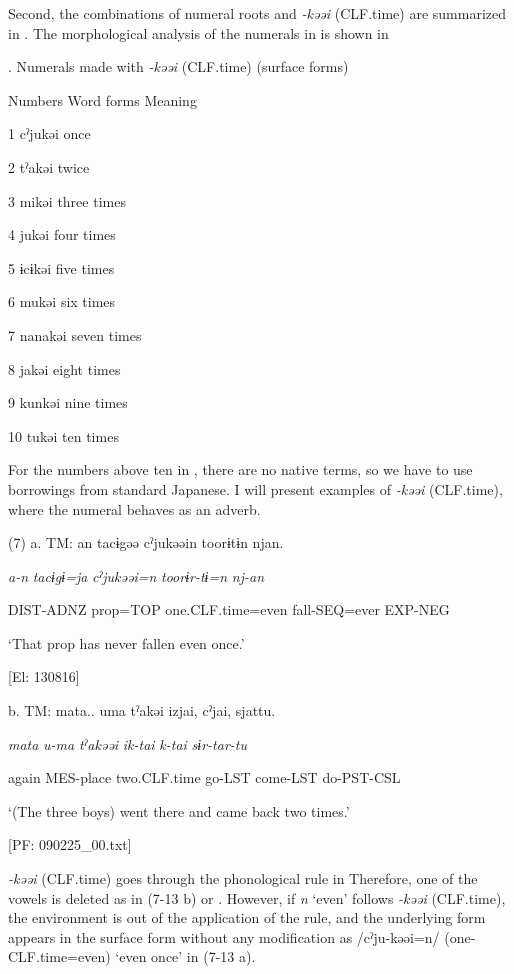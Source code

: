 Second, the combinations of numeral roots and \textit{{}-kəəi} (CLF.time) are summarized in . The morphological analysis of the numerals in  is shown in 

\begin{styleBeschriftung}
\textmd{}\textmd{. Numerals made with}\textmd{ \textit{-kəəi}}\textmd{ (CLF.time) (surface forms)}
\end{styleBeschriftung}

Numbers  Word forms  Meaning

1  cˀjukəi  once

2  tˀakəi  twice

3  mikəi  three times

4  jukəi  four times

5  ɨcɨkəi  five times

6  mukəi  six times

7  nanakəi  seven times

8  jakəi  eight times

9  kunkəi  nine times

10  tukəi  ten times

For the numbers above ten in , there are no native terms, so we have to use borrowings from standard Japanese. I will present examples of \textit{{}-kəəi} (CLF.time), where the numeral behaves as an adverb.

(7)  a.  TM:  an  tacɨgəə  cˀjukəəin  toorɨtɨn  njan.

      \textit{a-n}  \textit{tacɨgɨ=ja}  \textit{cˀjukəəi=n}  \textit{toorɨr-tɨ=n}  \textit{nj{}-an}

      DIST-ADNZ  prop=TOP  one.CLF.time=even  fall-SEQ=ever  EXP-NEG

      ‘That prop has never fallen even once.’

      [El: 130816]

  b.  TM:  mata..  uma  tˀakəi  izjai,  cˀjai,  sjattu.

      \textit{mata}  \textit{u-ma}  \textit{tˀakəəi}  \textit{ik-tai}  \textit{k-tai}  \textit{sɨr-tar-tu}

      again  MES-place  two.CLF.time  go-LST  come-LST  do-PST-CSL

      ‘(The three boys) went there and came back two times.’

      [PF: 090225\_00.txt]

\textit{{}-kəəi} (CLF.time) goes through the phonological rule in  Therefore, one of the vowels is deleted as in (7-13 b) or . However, if \textit{n} ‘even’ follows \textit{{}-kəəi} (CLF.time), the environment is out of the application of the rule, and the underlying form appears in the surface form without any modification as /cˀju-kəəi=n/ (one-CLF.time=even) ‘even once’ in (7-13 a).

